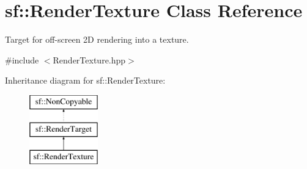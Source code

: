 \hypertarget{classsf_1_1_render_texture}{}\section{sf\+:\+:Render\+Texture Class Reference}
\label{classsf_1_1_render_texture}


Target for off-\/screen 2D rendering into a texture.  




{\ttfamily \#include $<$Render\+Texture.\+hpp$>$}

Inheritance diagram for sf\+:\+:Render\+Texture\+:\begin{figure}[H]
\begin{center}
\leavevmode
\includegraphics[height=3.000000cm]{classsf_1_1_render_texture}
\end{center}
\end{figure}
